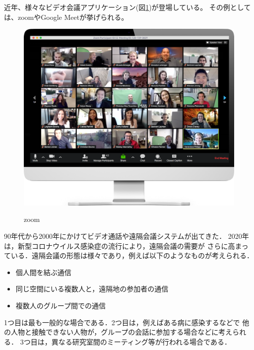 近年、様々なビデオ会議アプリケーション(図\ref{fig:1})が登場している。
その例としては、zoom\cite{1}やGoogle Meet\cite{2}が挙げられる。

\begin{figure}[tp]
  \centering
  \includegraphics[scale=0.5]{fig/zoom-monitor-screen.png}
  \caption{zoom}\label{fig:1}\cite{1}
\end{figure}

90年代から2000年にかけてビデオ通話や遠隔会議システムが出てきた．
2020年は，新型コロナウイルス感染症の流行により，遠隔会議の需要が
さらに高まっている．遠隔会議の形態は様々であり，例えば以下のようなものが考えられる．
\begin{itemize}
  \item 個人間を結ぶ通信
  \item 同じ空間にいる複数人と，遠隔地の参加者の通信
  \item 複数人のグループ間での通信
\end{itemize}

1つ目は最も一般的な場合である．2つ目は，例えばある病に感染するなどで
他の人物と接触できない人物が，グループの会話に参加する場合などに考えられる．
3つ目は，異なる研究室間のミーティング等が行われる場合である．

